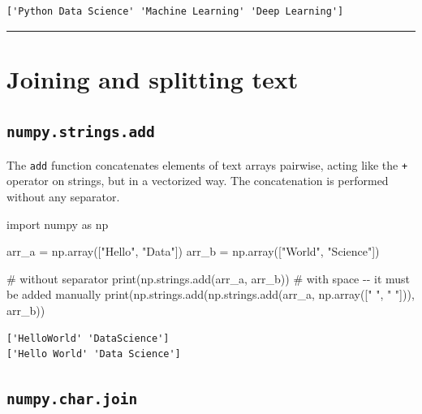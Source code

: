 \documentclass[
  english,
  letterpaper,
  DIV=11,
  numbers=noendperiod]{scrreprt}
\newenvironment{Shaded}{\begin{snugshade}}{\end{snugshade}}
\newcommand{\BuiltInTok}[1]{\textcolor[rgb]{0.00,0.23,0.31}{#1}}
\newcommand{\CommentTok}[1]{\textcolor[rgb]{0.37,0.37,0.37}{#1}}
\newcommand{\ImportTok}[1]{\textcolor[rgb]{0.00,0.46,0.62}{#1}}
\newcommand{\NormalTok}[1]{\textcolor[rgb]{0.00,0.23,0.31}{#1}}
\newcommand{\OperatorTok}[1]{\textcolor[rgb]{0.37,0.37,0.37}{#1}}
\newcommand{\StringTok}[1]{\textcolor[rgb]{0.13,0.47,0.30}{#1}}
\begin{document}
\begin{verbatim}
['Python Data Science' 'Machine Learning' 'Deep Learning']
\end{verbatim}

\begin{center}\rule{0.5\linewidth}{0.5pt}\end{center}

\section{Joining and splitting text}\label{joining-and-splitting-text}

\subsection{\texorpdfstring{\texttt{numpy.strings.add}}{numpy.strings.add}}\label{numpy.strings.add}

The \texttt{add} function concatenates elements of text arrays pairwise,
acting like the \texttt{+} operator on strings, but in a vectorized way.
The concatenation is performed without any separator.

\begin{Shaded}
\begin{Highlighting}[]
\ImportTok{import}\NormalTok{ numpy }\ImportTok{as}\NormalTok{ np}

\NormalTok{arr\_a }\OperatorTok{=}\NormalTok{ np.array([}\StringTok{"Hello"}\NormalTok{, }\StringTok{"Data"}\NormalTok{])}
\NormalTok{arr\_b }\OperatorTok{=}\NormalTok{ np.array([}\StringTok{"World"}\NormalTok{, }\StringTok{"Science"}\NormalTok{])}

\CommentTok{\# without separator}
\BuiltInTok{print}\NormalTok{(np.strings.add(arr\_a, arr\_b))}
\CommentTok{\# with space {-}{-} it must be added manually}
\BuiltInTok{print}\NormalTok{(np.strings.add(np.strings.add(arr\_a, np.array([}\StringTok{" "}\NormalTok{, }\StringTok{" "}\NormalTok{])), arr\_b))}
\end{Highlighting}
\end{Shaded}

\begin{verbatim}
['HelloWorld' 'DataScience']
['Hello World' 'Data Science']
\end{verbatim}

\subsection{\texorpdfstring{\texttt{numpy.char.join}}{numpy.char.join}}\label{numpy.char.join}
\end{document}
